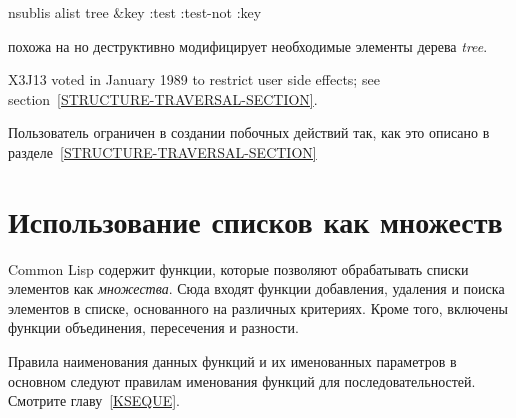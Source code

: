 \begin{defun}[Функция]
nsublis alist tree &key :test :test-not :key

 похожа на  но деструктивно модифицирует необходимые
элементы дерева \emph{tree}.

\begin{new}
X3J13 voted in January 1989
to restrict user side effects; see section~\ref{STRUCTURE-TRAVERSAL-SECTION}.
\end{new}

Пользователь ограничен в создании побочных действий так, как это описано в
разделе~\ref{STRUCTURE-TRAVERSAL-SECTION}
\end{defun}

\section{Использование списков как множеств}

Common Lisp содержит функции, которые позволяют обрабатывать списки элементов
как \emph{множества}.
Сюда входят функции добавления, удаления и поиска элементов в списке,
основанного на различных критериях.
Кроме того, включены функции объединения, пересечения и разности.

Правила наименования данных функций и их именованных параметров в основном
следуют правилам именования функций для последовательностей. Смотрите
главу~\ref{KSEQUE}.

